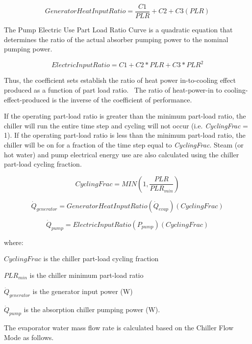 \begin{equation}
GeneratorHeatInputRatio = \frac{{C1}}{{PLR}} + C2 + C3\left( {PLR} \right)
\end{equation}

The Pump Electric Use Part Load Ratio Curve is a quadratic equation that determines the ratio of the actual absorber pumping power to the nominal pumping power.

\begin{equation}
ElectricInputRatio = C1 + C2 * PLR + C3 * PL{R^2}
\end{equation}

Thus, the coefficient sets establish the ratio of heat power in-to-cooling effect produced as a function of part load ratio.~ The ratio of heat-power-in to cooling-effect-produced is the inverse of the coefficient of performance.

If the operating part-load ratio is greater than the minimum part-load ratio, the chiller will run the entire time step and cycling will not occur (i.e. \emph{CyclingFrac} = 1). If the operating part-load ratio is less than the minimum part-load ratio, the chiller will be on for a fraction of the time step equal to \emph{CyclingFrac}. Steam (or hot water) and pump electrical energy use are also calculated using the chiller part-load cycling fraction.

\begin{equation}
CyclingFrac = MIN\left( {1,\frac{{PLR}}{{PL{R_{min}}}}} \right)
\end{equation}

\begin{equation}
{\dot Q_{generator}} = GeneratorHeatInputRatio\left( {{{\dot Q}_{evap}}} \right)\left( {CyclingFrac} \right)
\end{equation}

\begin{equation}
{\dot Q_{pump}} = ElectricInputRatio\left( {{P_{pump}}} \right)\left( {CyclingFrac} \right)
\end{equation}

where:

\(CyclingFrac\) is the chiller part-load cycling fraction

\(PL{R_{min}}\) is the chiller minimum part-load ratio

\({\dot Q_{generator}}\) is the generator input power (W)

\({\dot Q_{pump}}\) is the absorption chiller pumping power (W).

The evaporator water mass flow rate is calculated based on the Chiller Flow Mode as follows.

